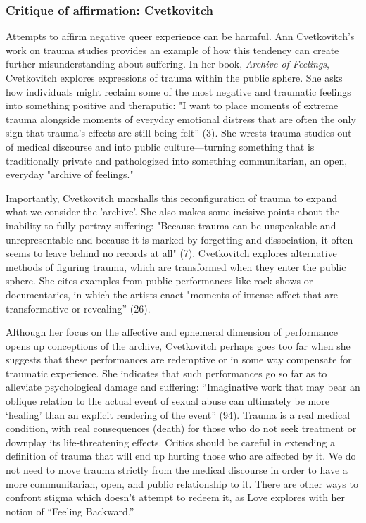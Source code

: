 \documentclass[11pt]{article}
\begin{document}
\subsubsection{Critique of affirmation: Cvetkovitch}
\label{sec:org806bbc4}

Attempts to affirm negative queer experience can be harmful. Ann
Cvetkovitch's work on trauma studies provides an example of how this
tendency can create further misunderstanding about suffering. In her
book, \emph{Archive of Feelings}, Cvetkovitch explores expressions of
trauma within the public sphere. She asks how individuals might
reclaim some of the most negative and traumatic feelings into
something positive and theraputic: "I want to place moments of extreme
trauma alongside moments of everyday emotional distress that are often
the only sign that trauma's effects are still being felt” (3). She
wrests trauma studies out of medical discourse and into public
culture---turning something that is traditionally private and
pathologized into something communitarian, an open, everyday "archive
of feelings."

Importantly, Cvetkovitch marshalls this reconfiguration of trauma to
expand what we consider the 'archive'. She also makes some incisive
points about the inability to fully portray suffering: "Because trauma
can be unspeakable and unrepresentable and because it is marked by
forgetting and dissociation, it often seems to leave behind no records
at all" (7). Cvetkovitch explores alternative methods of figuring
trauma, which are transformed when they enter the public sphere. She
cites examples from public performances like rock shows or
documentaries, in which the artists enact "moments of intense affect
that are transformative or revealing” (26). 

Although her focus on the affective and ephemeral dimension of
performance opens up conceptions of the archive, Cvetkovitch perhaps
goes too far when she suggests that these performances are redemptive
or in some way compensate for traumatic experience. She indicates that
such performances go so far as to alleviate psychological damage and
suffering: “Imaginative work that may bear an oblique relation to the
actual event of sexual abuse can ultimately be more ‘healing’ than an
explicit rendering of the event” (94). Trauma is a real medical
condition, with real consequences (death) for those who do not seek
treatment or downplay its life-threatening effects. Critics should be
careful in extending a definition of trauma that will end up hurting
those who are affected by it. We do not need to move trauma strictly
from the medical discourse in order to have a more communitarian,
open, and public relationship to it. There are other ways to confront
stigma which doesn’t attempt to redeem it, as Love explores with her
notion of “Feeling Backward.”
\end{document}
